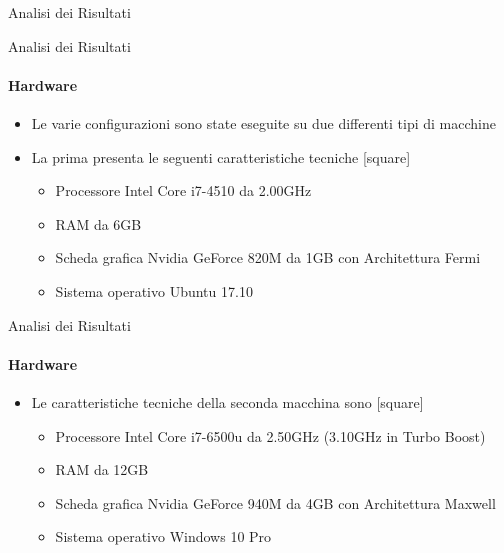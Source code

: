 \documentclass[
 ]{beamer}
\begin{document}
\begin{frame}[c]
  \centering
  \bigskip \bigskip    
  \Huge Analisi dei Risultati
\end{frame}

\begin{frame}{Analisi dei Risultati}
    \framesubtitle{Hardware}
    \smallskip
    \begin{itemize} [<+->]
        \setlength\itemsep{2em}
        \item \large Le varie configurazioni sono state eseguite su due differenti tipi di macchine
        \item \large La prima presenta le seguenti caratteristiche tecniche       
        \bigskip
        [square] 
        \begin{itemize} [<+->] 
        \setlength\itemsep{2.5em}
            \item \large Processore Intel Core i7-4510 da 2.00GHz
            \item \large RAM da 6GB
            \item \large Scheda grafica Nvidia GeForce 820M da 1GB con Architettura Fermi
            \item \large Sistema operativo Ubuntu 17.10                    
        \end{itemize}        
    \end{itemize}     
\end{frame}

\begin{frame}{Analisi dei Risultati}
    \framesubtitle{Hardware}
    \smallskip
    \begin{itemize} [<+->]
        \setlength\itemsep{2em}
        \item \large Le caratteristiche tecniche della seconda macchina sono            
        \bigskip
        [square] 
        \begin{itemize} [<+->] 
        \setlength\itemsep{2.5em}
            \item \large Processore Intel Core i7-6500u da 2.50GHz (3.10GHz in Turbo Boost)
            \item \large RAM da 12GB
            \item \large Scheda grafica Nvidia GeForce 940M da 4GB con Architettura Maxwell
            \item \large Sistema operativo Windows 10 Pro                    
        \end{itemize}        
    \end{itemize}     
\end{frame}
\end{document}
